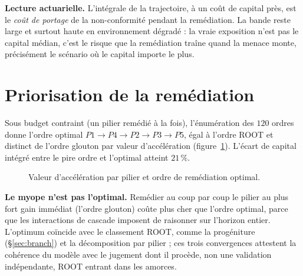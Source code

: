 \noindent \textbf{Lecture actuarielle.} L'intégrale de la trajectoire, à un coût de capital
près, est le \emph{coût de portage} de la non-conformité pendant la remédiation. La bande reste
large et surtout haute en environnement dégradé : la vraie exposition n'est pas le capital
médian, c'est le risque que la remédiation traîne quand la menace monte, précisément le scénario
où le capital importe le plus.

\section{Priorisation de la remédiation}
\label{sec:res-prio}

Sous budget contraint (un pilier remédié à la fois), l'énumération des $120$ ordres donne
l'ordre optimal $P1\to P4\to P2\to P3\to P5$, égal à l'ordre ROOT et distinct de l'ordre
glouton par valeur d'accélération (figure~\ref{fig:prio}). L'écart de capital intégré entre le
pire ordre et l'optimal atteint $21\,\%$.

\begin{figure}[htbp]\centering
{}
\caption{Valeur d'accélération par pilier et ordre de remédiation optimal.}
\label{fig:prio}
\end{figure}

\begin{cle}
\textbf{Le myope n'est pas l'optimal.} Remédier au coup par coup le pilier au plus fort gain
immédiat (l'ordre glouton) coûte plus cher que l'ordre optimal, parce que les interactions de
cascade imposent de raisonner sur l'horizon entier. L'optimum coïncide avec le classement
ROOT, comme la progéniture (\S\ref{sec:branch}) et la décomposition par pilier ; ces trois
convergences attestent la cohérence du modèle avec le jugement dont il procède, non une
validation indépendante, ROOT entrant dans les amorces.
\end{cle}

